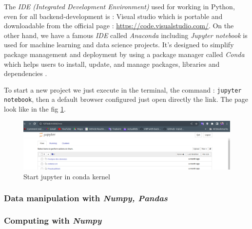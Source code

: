 \documentclass[12pt,a4paper]{report}
\begin{document}
The \textit{IDE (Integrated Development Environment)} used for working in Python, even for all backend-development is : Visual studio which is portable and downloadable from the official page : \url{https://code.visualstudio.com/}.  On the other hand, we have a famous \textit{IDE} called \textit{Anaconda} including \textit{Jupyter notebook} is used for machine learning and data science projects. It's designed to simplify package management and deployment by using a package manager called \textit{Conda} which helps users to install, update, and manage packages, libraries and dependencies \cite{teimourzadeh2022application}.

To start a new project we just execute in the terminal, the command :  \texttt{jupyter notebook}, then a default browser configured just open directly the link. The page look like in the fig \ref{fig:jupyteropen}.
\begin{figure}
	\centering
	\includegraphics[width=1\linewidth]{jupyterOpen}
	\caption{Start jupyter in conda kernel}
	\label{fig:jupyteropen}
\end{figure}  

\subsubsection{Data manipulation with \textit{Numpy, Pandas}}
 
 \subsubsection*{Computing with \textit{Numpy}}
\end{document}
